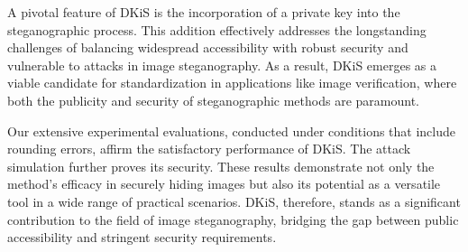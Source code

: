 \documentclass{article}
\begin{document}
A pivotal feature of DKiS is the incorporation of a private key into the steganographic process. This addition effectively addresses the longstanding challenges of balancing widespread accessibility with robust security and vulnerable to attacks in image steganography. As a result, DKiS emerges as a viable candidate for standardization in applications like image verification, where both the publicity and security of steganographic methods are paramount.

Our extensive experimental evaluations, conducted under conditions that include rounding errors, affirm the satisfactory performance of DKiS. The attack simulation further proves its security. These results demonstrate not only the method's efficacy in securely hiding images but also its potential as a versatile tool in a wide range of practical scenarios. DKiS, therefore, stands as a significant contribution to the field of image steganography, bridging the gap between public accessibility and stringent security requirements.

\end{document}
